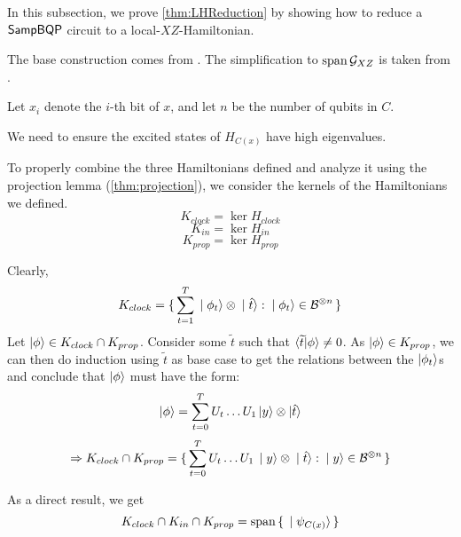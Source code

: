 
In this subsection, we prove \cref{thm:LHReduction} by showing how to reduce a $\operatorname{\mathsf{SampBQP}}$ circuit to a local-$XZ$-Hamiltonian.

	The base construction comes from \cite{kitaev2002classical}. The simplification to $\operatorname*{\operatorname{span}}\mathcal{G}_{XZ}$ is taken from \cite{PhysRevA.78.012352}.

	Let $x_i$ denote the $i$-th bit of $x$, and let $n$ be the number of qubits in $C$.

	We need to ensure the excited states of $H_{C(x)}$ have high eigenvalues.

	

	To properly combine the three Hamiltonians defined and analyze it using the projection lemma (\cref{thm:projection}), we consider the kernels of the Hamiltonians we defined.
	$$K_{clock}=\ker H_{clock}$$
	$$K_{in}=\ker H_{in}$$
	$$K_{prop}=\ker H_{prop}$$

	Clearly,
	$$K_{clock}=\set{\sum_{t=1}^T \ket{\phi_t}\otimes\ket{\hat{t}}:\ket{\phi_t}\in\mathcal{B}^{\otimes n}}$$
	Let $\ket\phi\in K_{clock}\cap K_{prop}$.
	Consider some $\widetilde{t}$ such that $\braket{\widetilde{t}|\phi}\ne0$.
	As $\ket\phi\in K_{prop}$, we can then do induction using $\widetilde{t}$ as base case to get the relations between the $\ket{\phi_t}$s and conclude that $\ket\phi$ must have the form:
	$$\ket\phi=\sum_{t=0}^TU_t\ldots U_1\ket{y}\otimes\ket{\hat{t}}$$
	$$\Rightarrow K_{clock}\cap K_{prop}=\set{\sum_{t=0}^TU_t\ldots U_1\ket{y}\otimes\ket{\hat{t}}: \ket{y}\in\mathcal{B}^{\otimes n}}$$

	As a direct result, we get
	$$K_{clock}\cap K_{in}\cap K_{prop}=\operatorname*{\operatorname{span}}\set{\ket{\psi_{C(x)}}}$$

